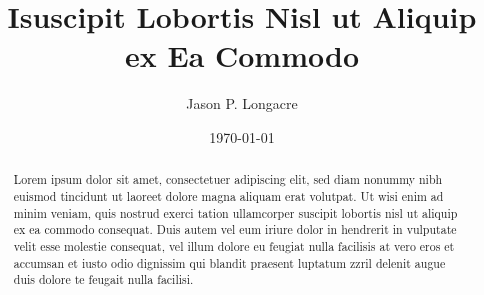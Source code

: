 \documentclass{revtex4}
\begin{document}

\title{Isuscipit Lobortis Nisl ut Aliquip ex Ea Commodo}


\author{Jason P. Longacre}


\date{\today}

\begin{abstract}
Lorem ipsum dolor sit amet, consectetuer adipiscing elit, sed diam
nonummy nibh euismod tincidunt ut laoreet dolore magna aliquam erat
volutpat. Ut wisi enim ad minim veniam, quis nostrud exerci tation
ullamcorper suscipit lobortis nisl ut aliquip ex ea commodo consequat.
Duis autem vel eum iriure dolor in hendrerit in vulputate velit esse
molestie consequat, vel illum dolore eu feugiat nulla facilisis at
vero eros et accumsan et iusto odio dignissim qui blandit praesent
luptatum zzril delenit augue duis dolore te feugait nulla facilisi.
\end{abstract}


\setlength{\topmargin}{0in}

\maketitle
\end{document}
